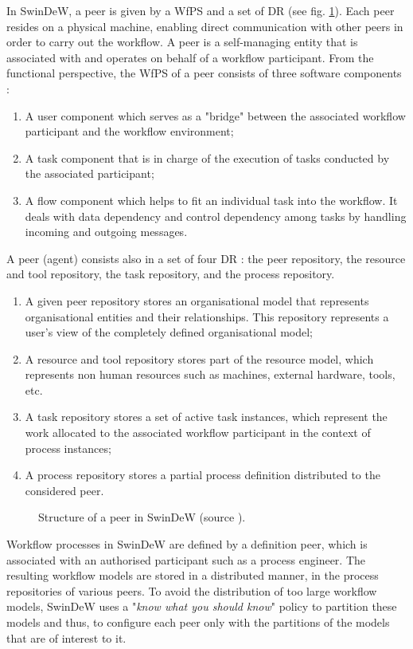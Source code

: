 In SwinDeW, a peer is given by a WfPS and a set of DR (see fig. \ref{chap1:fig:swindew-wfps}). Each peer resides on a physical machine, enabling direct communication with other peers in order to carry out the workflow. A peer is a self-managing entity that is associated with and operates on behalf of a workflow participant. From the functional perspective, the WfPS of a peer consists of three software components :
\begin{enumerate}
	\item A user component which serves as  a "bridge" between the associated workflow participant and the workflow environment;
	\item A task component that is in charge of the execution of tasks conducted by the associated participant;
	\item A flow component which helps to fit an individual task into the workflow. It deals with data dependency and control dependency among tasks by handling incoming and outgoing messages.
\end{enumerate}
A peer (agent) consists also in a set of four DR : the peer repository, the resource and tool repository, the task repository, and the process repository.
\begin{enumerate}
	\item A given peer repository stores an organisational model that represents organisational entities and their relationships. This repository represents a user's view of the completely defined organisational model;
	\item A resource and tool repository stores part of the resource model, which represents non human resources such as machines, external hardware, tools, etc.
	\item A task repository stores a set of active task instances, which represent the work allocated to the associated workflow participant in the context of process instances;
	\item A process repository stores a partial process definition distributed to the considered peer.
\end{enumerate}
\begin{figure}[ht!]
	\noindent
	\caption{Structure of a peer in SwinDeW (source \cite{junYan06}).}
	\label{chap1:fig:swindew-wfps}
\end{figure}

Workflow processes in SwinDeW are defined by a definition peer, which is associated with an authorised participant such as a process engineer. The resulting workflow models are stored in a distributed manner, in the process repositories of various peers. To avoid the distribution of too large workflow models, SwinDeW uses a "\textit{know what you should know}" policy to partition these models and thus, to configure each peer only with the partitions of the models that are of interest to it.

